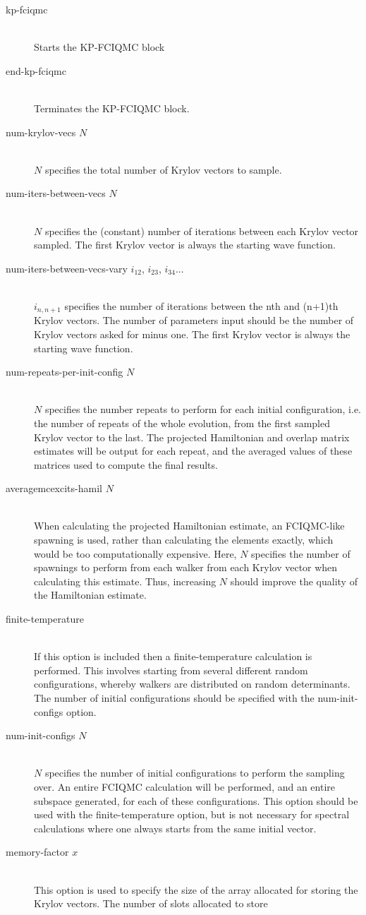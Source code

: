 \documentclass[a4paper,notitlepage,dvipsnames]{scrreprt}
\newcommand\codeitem[1]{\needspace{1.5\baselineskip}\item[\textnormal{\ttfamily #1 \nopagebreak}] \hfill \\ \nopagebreak}
\begin{document}
  \begin{description}
    \codeitem{kp-fciqmc}
    Starts the KP-FCIQMC block
    \codeitem{end-kp-fciqmc}
    Terminates the KP-FCIQMC block.
    \codeitem{num-krylov-vecs $N$}
    $N$ specifies the total number of Krylov vectors to sample.
    \codeitem{num-iters-between-vecs $N$}
    $N$ specifies the (constant) number of iterations between each Krylov
    vector sampled. The first Krylov vector is always the starting wave
    function.
    \codeitem{num-iters-between-vecs-vary $i_{12}$, $i_{23}$, $i_{34}$...}
    $i_{n,n+1}$ specifies the number of iterations between the nth and
    (n+1)th Krylov vectors. The number of parameters input should be
    the number of Krylov vectors asked for minus one. The first Krylov
    vector is always the starting wave function.
    \codeitem{num-repeats-per-init-config $N$}
    $N$ specifies the number repeats to perform for each initial
    configuration, i.e. the number of repeats of the whole evolution,
    from the first sampled Krylov vector to the last. The projected
    Hamiltonian and overlap matrix estimates will be output for each
    repeat, and the averaged values of these matrices used to compute
    the final results.
    \codeitem{averagemcexcits-hamil $N$}
    When calculating the projected Hamiltonian estimate, an FCIQMC-like
    spawning is used, rather than calculating the elements exactly,
    which would be too computationally expensive. Here, $N$ specifies the
    number of spawnings to perform from each walker from each Krylov
    vector when calculating this estimate. Thus, increasing $N$ should
    improve the quality of the Hamiltonian estimate.
    \codeitem{finite-temperature}
    If this option is included then a finite-temperature calculation is
    performed. This involves starting from several different random
    configurations, whereby walkers are distributed on random
    determinants. The number of initial configurations should be
    specified with the num-init-configs option.
    \codeitem{num-init-configs $N$}
    $N$ specifies the number of initial configurations to perform the
    sampling over. An entire FCIQMC calculation will be performed, and
    an entire subspace generated, for each of these configurations.
    This option should be used with the finite-temperature option, but
    is not necessary for spectral calculations where one always starts
    from the same initial vector.
    \codeitem{memory-factor $x$}
    This option is used to specify the size of the array allocated for
    storing the Krylov vectors. The number of slots allocated to store

\end{description}
\end{document}
